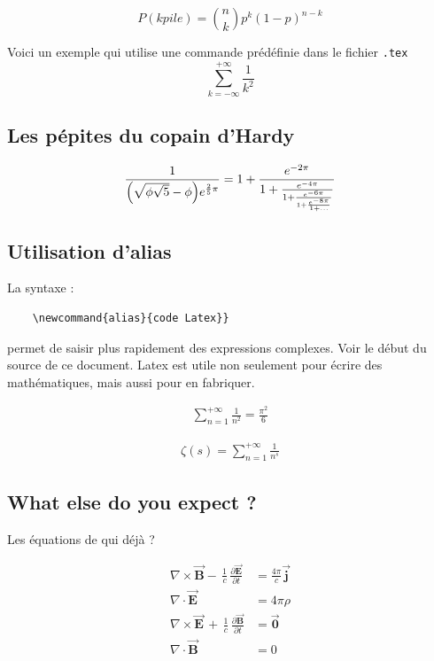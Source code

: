 \documentclass[twocolumn,a4paper]{IEEEtranfr}
\newcommand{\bear}{\begin{eqnarray}}
\newcommand{\ear}{\end{eqnarray}}
\newcommand{\sm}[1]{\sum_{#1=-\infty}^{+\infty}}
\newcommand{\smu}[1]{\sum_{#1=1}^{+\infty}}
\begin{document}
{\begin{equation}
    P(k pile)   = {n \choose k} p^k (1-p)^{ n-k}
\end{equation}

Voici un exemple qui utilise une commande prédéfinie dans le fichier {\tt .tex}
\begin{equation}
\sm{k} \frac{1}{k^2}
\end{equation}
\subsection{Les pépites du copain d'Hardy}

\begin{equation}
  \frac{1}{\Bigl(\sqrt{\phi \sqrt{5}}-\phi\Bigr) e^{\frac25 \pi}} =
    1 + \frac{e^{-2\pi}} 
             {1+\frac{e^{-4\pi}} 
             {1+\frac{e^{-6\pi}}
             {1+\frac{e^{-8\pi}} 
             {1+\ldots} } } }
\end{equation}
\subsection{Utilisation d'alias}

La syntaxe : 
\begin{verbatim} 
    \newcommand{alias}{code Latex}}
\end{verbatim}
permet de saisir plus rapidement des expressions complexes. 
Voir le début du source de ce document. Latex est utile non seulement pour
écrire des mathématiques, mais aussi pour en fabriquer.

\bear
\smu{n} \frac{1}{n^2} =  \frac{\pi^2}{6}
\ear

\bear
\zeta(s)= \smu{n} \frac{1}{n^s}
\ear

\subsection{What else do you expect ? }

Les équations de qui déjà ?

\begin{equation}
\begin{aligned}
    \nabla \times \vec{\mathbf{B}} -\, \frac1c\,
    \frac{\partial\vec{\mathbf{E}}}{\partial t} & = \frac{4\pi}{c}\vec{\mathbf{j}} \\  
    \nabla \cdot \vec{\mathbf{E}} & = 4 \pi \rho \\
    \nabla \times \vec{\mathbf{E}}\, +\, \frac1c\,
    \frac{\partial\vec{\mathbf{B}}}{\partial t} & = \vec{\mathbf{0}} \\
    \nabla \cdot \vec{\mathbf{B}} & = 0
\end{aligned}
\end{equation}
}
\end{document}
